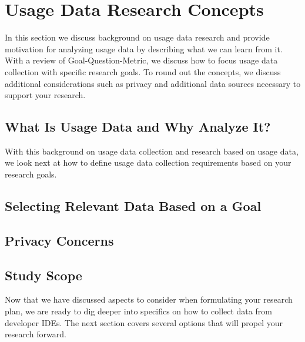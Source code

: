 
\section{Usage Data Research Concepts}

In this section we discuss background on usage data research and provide motivation for analyzing usage data by describing what we can learn from it.  With a review of Goal-Question-Metric, we discuss how to focus usage data collection with specific research goals.  To round out the concepts, we discuss additional considerations such as privacy and additional data sources necessary to support your research.

\subsection{What Is Usage Data and Why Analyze It?}

\vspace{0.1in}

With this background on usage data collection and research based on usage data, we look next at how to define usage data collection requirements based on your research goals.

\subsection{Selecting Relevant Data Based on a Goal}
\label{SelectingData}



\subsection{Privacy Concerns}


\subsection{Study Scope}


\vspace{0.1in}
Now that we have discussed aspects to consider when formulating your research plan, we are ready to dig deeper into specifics on how to collect data from developer IDEs.  The next section covers several options that will propel your research forward.


